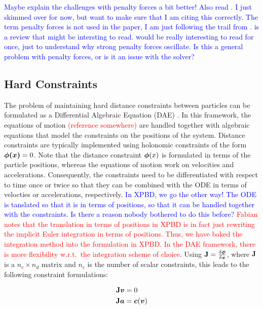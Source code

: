 \textcolor{blue}{Maybe explain the challenges with penalty forces a bit better! Also read \cite{terz1987, nealen2006, rubin1957}. 
I just skimmed over \cite{terz1987} for now, but want to make sure that I am citing this correctly. The term penalty forces is not used
in the paper, I am just following the trail from \cite{servin2006}. \cite{nealen2006} is a review that might be intersting to read.
\cite{rubin1957} would be really interesting to read for once, just to understand why strong penalty forces oscillate. Is this a
general problem with penalty forces, or is it an issue with the solver?}

\subsection{Hard Constraints}\label{ss:hard-constraints}
The problem of maintaining hard distance constraints between particles can be formulated as a Differential Algebraic Equation (DAE)
\cite{ascher1995, baraff1996}. In this framework, the equations of motion \textcolor{red}{(reference somewhere)} are handled together 
with algebraic equations that model the constraints on the positions of the system. Distance constraints are typically implemented using 
holonomic constraints 
of the form $\bm{\phi(x)} = 0$. Note that the distance constraint $\bm{\phi}(x)$ is formulated in terms of the particle positions, 
whereas the equations of motion work on velocities and accelerations. Consequently, the constraints need to be differentiated with 
respect to time once or twice so that they can be 
combined with the ODE in terms of velocties or accelerations, respectively. \textcolor{blue}{In XPBD, we go the other way! The ODE
is tanslated so that it is in terms of positions, so that it can be handled together with the constraints. Is there a reason nobody 
bothered to do this before?} \textcolor{red}{Fabian notes that the translation in terms of positions in XPBD is in fact just rewriting
the implicit Euler integration in terms of positions. Thus, we have baked the integration method into the formulation in XPBD. In the DAE
framework, there is more flexibility w.r.t.\ the integration scheme of choice}. Using $\mathbf{J} = \frac{\delta \bm{\phi}}{\delta \bm{x}}$, 
where $\mathbf{J}$ is a $n_c \times n_d$ matrix and $n_c$ is the number of scalar constraints, this leads to the following constraint 
formulations:

\begin{align*}
    \mathbf{J}\bm{v} &= 0 \\
    \mathbf{J}\bm{a} &= \bm{c}(\bm{v})
\end{align*}

